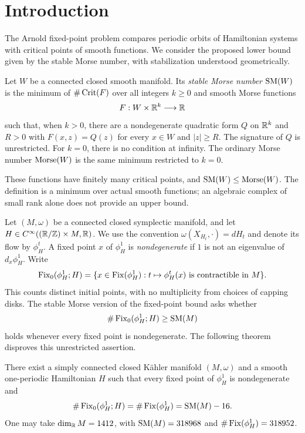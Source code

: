 \section{Introduction}
\label{sec:introduction}

The Arnold fixed-point problem compares periodic orbits of Hamiltonian systems with critical points of smooth functions. We consider the proposed lower bound given by the stable Morse number, with stabilization understood geometrically.

\begin{definition}
Let $W$ be a connected closed smooth manifold. Its \emph{stable Morse number} $\operatorname{SM}(W)$ is the minimum of $\#\operatorname{Crit}(F)$ over all integers $k\geq0$ and smooth Morse functions
\[
 F:W\times\mathbb R^k\longrightarrow\mathbb R
\]
such that, when $k>0$, there are a nondegenerate quadratic form $Q$ on $\mathbb R^k$ and $R>0$ with $F(x,z)=Q(z)$ for every $x\in W$ and $|z|\geq R$. The signature of $Q$ is unrestricted. For $k=0$, there is no condition at infinity. The ordinary Morse number $\operatorname{Morse}(W)$ is the same minimum restricted to $k=0$.
\end{definition}

These functions have finitely many critical points, and $\operatorname{SM}(W)\leq\operatorname{Morse}(W)$. The definition is a minimum over actual smooth functions; an algebraic complex of small rank alone does not provide an upper bound.

Let $(M,\omega)$ be a connected closed symplectic manifold, and let $H\in C^\infty((\mathbb R/\mathbb Z)\times M,\mathbb R)$. We use the convention $\omega(X_{H_t},\cdot)=dH_t$ and denote its flow by $\phi_H^t$. A fixed point $x$ of $\phi_H^1$ is \emph{nondegenerate} if $1$ is not an eigenvalue of $d_x\phi_H^1$. Write
\[
 \operatorname{Fix}_0(\phi_H^1;H)=\{x\in\operatorname{Fix}(\phi_H^1):t\mapsto\phi_H^t(x)\text{ is contractible in }M\}.
\]
This counts distinct initial points, with no multiplicity from choices of capping disks. The stable Morse version of the fixed-point bound asks whether
\begin{equation}\label{eq:proposed-bound}
 \#\operatorname{Fix}_0(\phi_H^1;H)\geq\operatorname{SM}(M)
\end{equation}
holds whenever every fixed point is nondegenerate. The following theorem disproves this unrestricted assertion.

\begin{theorem}\label{thm:main}
There exist a simply connected closed Kähler manifold $(M,\omega)$ and a smooth one-periodic Hamiltonian $H$ such that every fixed point of $\phi_H^1$ is nondegenerate and
\[
 \#\operatorname{Fix}_0(\phi_H^1;H)=\#\operatorname{Fix}(\phi_H^1)=\operatorname{SM}(M)-16.
\]
One may take $\dim_{\mathbb R}M=1412$, with $\operatorname{SM}(M)=318968$ and $\#\operatorname{Fix}(\phi_H^1)=318952$.
\end{theorem}

